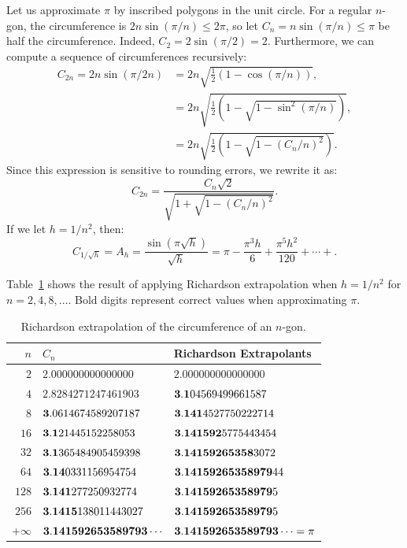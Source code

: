 \begin{example}
Let us approximate $\pi$ by inscribed polygons in the unit circle. For a regular $n$-gon, the circumference is $2n\sin(\pi/n) \le 2\pi$, so let $C_n = n\sin(\pi/n) \le \pi$ be half the circumference. Indeed, $C_2 = 2\sin(\pi/2) = 2$. Furthermore, we can compute a sequence of circumferences recursively:
\begin{align*}
C_{2n} = 2n\sin(\pi/2n) & = 2n\sqrt{\frac{1}{2}(1-\cos(\pi/n))},\\
& = 2n\sqrt{\frac{1}{2}\left(1-\sqrt{1-\sin^2(\pi/n)}\right)},\\
& = 2n\sqrt{\frac{1}{2}\left(1-\sqrt{1-(C_n/n)^2}\right)}.
\end{align*}
Since this expression is sensitive to rounding errors, we rewrite it as:
\[
C_{2n} = \dfrac{C_n\sqrt{2}}{\sqrt{1+\sqrt{1-(C_n/n)^2}}}.
\]
If we let $h = 1/n^2$, then:
\[
C_{1/\sqrt{h}} = A_h = \dfrac{\sin(\pi \sqrt{h})}{\sqrt{h}} = \pi - \dfrac{\pi^3h}{6} + \dfrac{\pi^5h^2}{120}+\cdots+.
\]

Table~\ref{table:Richardson1} shows the result of applying Richardson extrapolation when $h = 1/n^2$ for $n=2,4,8,\ldots.$ Bold digits represent correct values when approximating $\pi$.
\begin{table}[htdp]
\caption{Richardson extrapolation of the circumference of an $n$-gon.}
\begin{center}
\begin{tabular}{rll}
\hline
$n$ & $C_n$ & Richardson Extrapolants\\
\hline
$2$ & $2.000000000000000$ & $2.000000000000000$\\
$4$ & $2.8284271247461903$ & ${\bf 3.1}04569499661587$\\
$8$ & ${\bf 3}.0614674589207187$ & ${\bf 3.141}4527750222714$\\
$16$ & ${\bf 3.1}21445152258053$ & ${\bf 3.141592}5775443454$\\
$32$ & ${\bf 3.1}365484905459398$ & ${\bf 3.14159265358}3072$\\
$64$ & ${\bf 3.14}0331156954754$ & ${\bf 3.14159265358979}44$\\
$128$ & ${\bf 3.141}277250932774$ & ${\bf 3.14159265358979}5$\\
$256$ & ${\bf 3.1415}138011443027$ & ${\bf 3.14159265358979}5$\\
\hline
$+\infty$ & ${\bf 3.141592653589793\cdots}$ & ${\bf 3.141592653589793\cdots} =\pi$\\
\hline
\end{tabular}
\end{center}
\label{table:Richardson1}
\end{table}%
\end{example}

